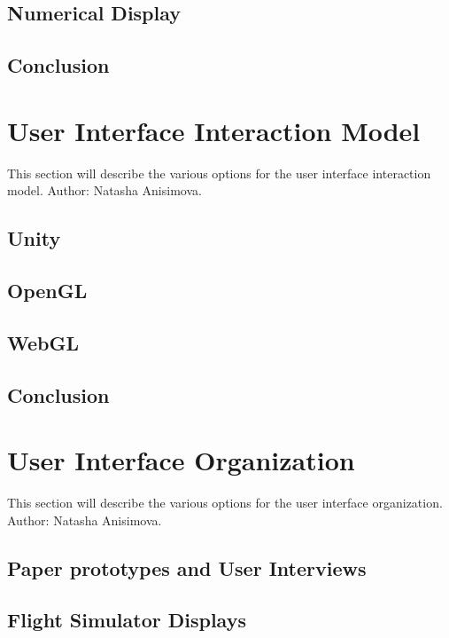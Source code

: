 \documentclass[10pt,draftclsnofoot,onecolumn]{IEEEtran}
\begin{document}
	\subsection{Numerical Display}
	
	\subsection{Conclusion}
	
	\section{User Interface Interaction Model}
	This section will describe the various options for the user interface interaction model. Author: Natasha Anisimova.
	
	\subsection{Unity}
	
	\subsection{OpenGL}
	
	\subsection{WebGL}
	
	\subsection{Conclusion}
	
	\section{User Interface Organization}
	This section will describe the various options for the user interface organization. Author: Natasha Anisimova.
	
	\subsection{Paper prototypes and User Interviews}
	
	\subsection{Flight Simulator Displays}
	
\end{document}
